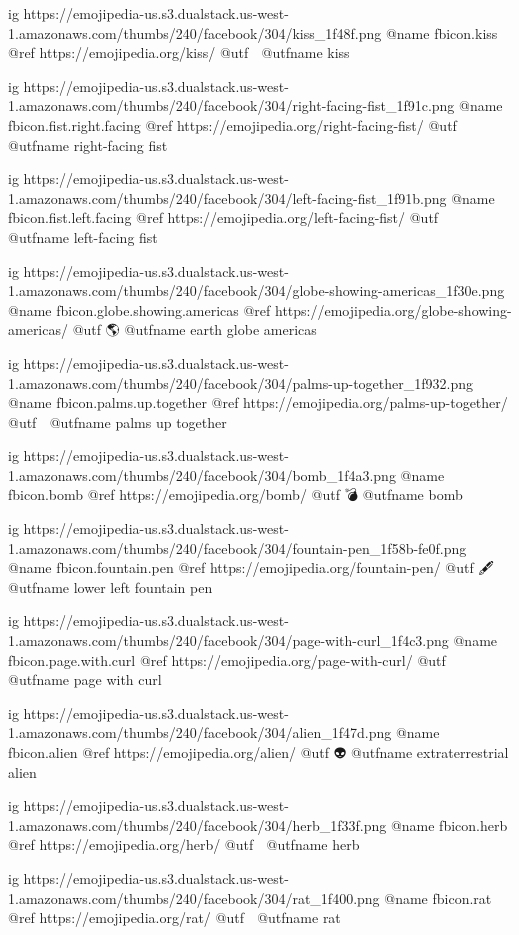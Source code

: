   ig https://emojipedia-us.s3.dualstack.us-west-1.amazonaws.com/thumbs/240/facebook/304/kiss_1f48f.png
  @name fbicon.kiss
  @ref https://emojipedia.org/kiss/
  @utf 💏
  @utfname kiss

  ig https://emojipedia-us.s3.dualstack.us-west-1.amazonaws.com/thumbs/240/facebook/304/right-facing-fist_1f91c.png
  @name fbicon.fist.right.facing
  @ref https://emojipedia.org/right-facing-fist/
  @utf 🤜
  @utfname right-facing fist

  ig https://emojipedia-us.s3.dualstack.us-west-1.amazonaws.com/thumbs/240/facebook/304/left-facing-fist_1f91b.png
  @name fbicon.fist.left.facing
  @ref https://emojipedia.org/left-facing-fist/
  @utf 🤛
  @utfname left-facing fist

  ig https://emojipedia-us.s3.dualstack.us-west-1.amazonaws.com/thumbs/240/facebook/304/globe-showing-americas_1f30e.png
  @name fbicon.globe.showing.americas
  @ref https://emojipedia.org/globe-showing-americas/
  @utf 🌎
  @utfname earth globe americas

  ig https://emojipedia-us.s3.dualstack.us-west-1.amazonaws.com/thumbs/240/facebook/304/palms-up-together_1f932.png
  @name fbicon.palms.up.together
  @ref https://emojipedia.org/palms-up-together/
  @utf 🤲
  @utfname palms up together

  ig https://emojipedia-us.s3.dualstack.us-west-1.amazonaws.com/thumbs/240/facebook/304/bomb_1f4a3.png
  @name fbicon.bomb
  @ref https://emojipedia.org/bomb/
  @utf 💣
  @utfname bomb

  ig https://emojipedia-us.s3.dualstack.us-west-1.amazonaws.com/thumbs/240/facebook/304/fountain-pen_1f58b-fe0f.png
  @name fbicon.fountain.pen
  @ref https://emojipedia.org/fountain-pen/
  @utf 🖋
  @utfname lower left fountain pen

  ig https://emojipedia-us.s3.dualstack.us-west-1.amazonaws.com/thumbs/240/facebook/304/page-with-curl_1f4c3.png
  @name fbicon.page.with.curl
  @ref https://emojipedia.org/page-with-curl/
  @utf 📃
  @utfname page with curl

  ig https://emojipedia-us.s3.dualstack.us-west-1.amazonaws.com/thumbs/240/facebook/304/alien_1f47d.png
  @name fbicon.alien
  @ref https://emojipedia.org/alien/
  @utf 👽
  @utfname extraterrestrial alien

  ig https://emojipedia-us.s3.dualstack.us-west-1.amazonaws.com/thumbs/240/facebook/304/herb_1f33f.png
  @name fbicon.herb
  @ref https://emojipedia.org/herb/
  @utf 🌿
  @utfname herb

  ig https://emojipedia-us.s3.dualstack.us-west-1.amazonaws.com/thumbs/240/facebook/304/rat_1f400.png
  @name fbicon.rat
  @ref https://emojipedia.org/rat/
  @utf 🐀
  @utfname rat


